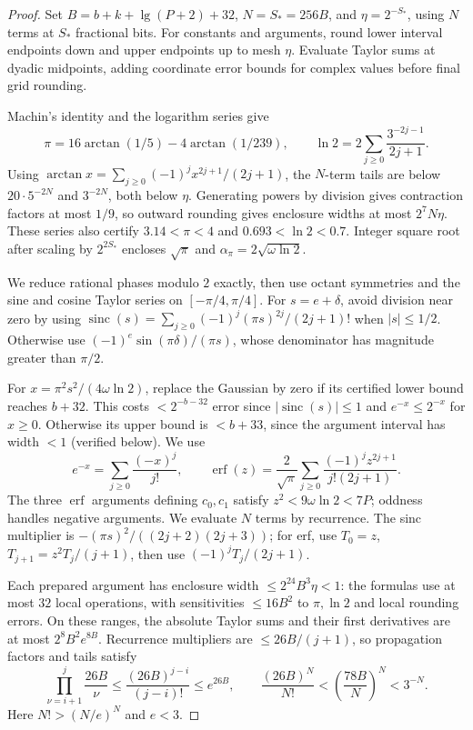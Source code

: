 \documentclass[11pt]{article}
\theoremstyle{definition}
\newcommand{\sinc}{\operatorname{sinc}}
\newcommand{\erf}{\operatorname{erf}}
\newcommand{\abs}[1]{\left\lvert #1 \right\rvert}
\begin{document}
\begin{proof}
Set $B=b+k+\lg(P+2)+32$, $N=S_*=256B$, and $\eta=2^{-S_*}$,
using $N$ terms at $S_*$ fractional bits.
For constants and arguments, round lower interval endpoints down and upper
endpoints up to mesh $\eta$.
Evaluate Taylor sums at dyadic midpoints, adding coordinate error bounds
for complex values before final grid rounding.

Machin's identity and the logarithm series give
\[
 \pi=16\arctan(1/5)-4\arctan(1/239),\qquad
 \ln2=2\sum_{j\ge0}\frac{3^{-2j-1}}{2j+1}.
\]
Using $\arctan x=\sum_{j\ge0}(-1)^jx^{2j+1}/(2j+1)$, the $N$-term tails
are below $20\cdot5^{-2N}$ and $3^{-2N}$, both below $\eta$.
Generating powers by division gives contraction factors at most $1/9$,
so outward rounding gives enclosure widths at most $2^7N\eta$.
These series also certify $3.14<\pi<4$ and $0.693<\ln2<0.7$.
Integer square root after scaling by $2^{2S_*}$ encloses
$\sqrt\pi$ and $\alpha_\pi=2\sqrt{\omega\ln2}$.

We reduce rational phases modulo $2$ exactly, then use octant symmetries and
the sine and cosine Taylor series on $[-\pi/4,\pi/4]$.
For $s=e+\delta$, avoid division near zero by using
$\sinc(s)=\sum_{j\ge0}(-1)^j(\pi s)^{2j}/(2j+1)!$ when $\abs{s}\le1/2$.
Otherwise use $(-1)^e\sin(\pi\delta)/(\pi s)$, whose denominator has
magnitude greater than $\pi/2$.

For $x=\pi^2s^2/(4\omega\ln2)$, replace the Gaussian by zero if its
certified lower bound reaches $b+32$.
This costs $<2^{-b-32}$ error since $\abs{\sinc(s)}\le1$ and
$e^{-x}\le2^{-x}$ for $x\ge0$.
Otherwise its upper bound is $<b+33$, since the argument interval has width
$<1$ (verified below). We use
\[
 e^{-x}=\sum_{j\ge0}\frac{(-x)^j}{j!},\qquad
 \erf(z)=\frac2{\sqrt\pi}\sum_{j\ge0}
             \frac{(-1)^jz^{2j+1}}{j!(2j+1)}.
\]
The three $\erf$ arguments defining $c_0,c_1$ satisfy
$z^2<9\omega\ln2<7P$; oddness handles negative arguments.
We evaluate $N$ terms by recurrence.
The sinc multiplier is $-(\pi s)^2/((2j+2)(2j+3))$;
for erf, use $T_0=z$, $T_{j+1}=z^2T_j/(j+1)$, then use
$(-1)^jT_j/(2j+1)$.

Each prepared argument has enclosure width $\le2^{24}B^3\eta<1$:
the formulas use at most $32$ local operations, with sensitivities
$\le16B^2$ to $\pi,\ln2$ and local rounding errors.
On these ranges, the absolute Taylor sums and their first derivatives are
at most $2^8B^2e^{8B}$.
Recurrence multipliers are $\le26B/(j+1)$, so propagation factors and tails satisfy
\[
 \prod_{\nu=i+1}^{j}\frac{26B}{\nu}
 \le\frac{(26B)^{j-i}}{(j-i)!}\le e^{26B},
 \qquad
 \frac{(26B)^N}{N!}
 <\left(\frac{78B}{N}\right)^N<3^{-N}.
\]
Here $N!>(N/e)^N$ and $e<3$.


\end{proof}
\end{document}
